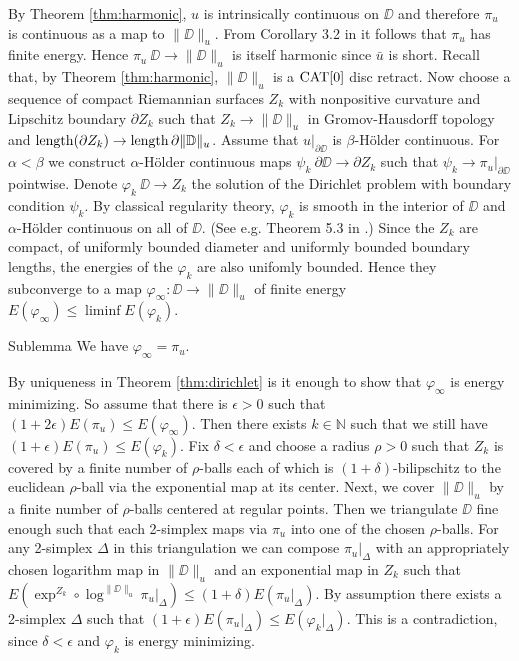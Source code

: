 \documentclass[a4paper,10pt]{amsart}
\begin{document}
By Theorem \ref{thm:harmonic}, $u$ is intrinsically continuous on $\DD$ and therefore $\pi_u$ is continuous as a map to $\|\DD\|_u$. From 
Corollary 3.2 in \cite{LW3} it follows that $\pi_u$ has finite energy. Hence $\pi_u\:\DD\to\|\DD\|_u$ is itself harmonic since $\bar u$
is short. Recall that, by Theorem \ref{thm:harmonic}, $\|\DD\|_u$ is a $\mathop{\rm CAT}\nolimits[0]$ disc retract. Now choose a sequence of compact Riemannian surfaces 
$Z_k$ with nonpositive curvature and Lipschitz boundary $\partial Z_k$
such that $Z_k\to\|\DD\|_u$ in Gromov-Hausdorff topology and $\mathop{\rm length}\nolimits(\partial Z_k)\to\mathop{\rm length}\nolimits \partial\|\mathbb{D}\|_u$. Assume that
$u|_{\partial\DD}$ is $\beta$-H\"older continuous. For $\alpha<\beta$ we construct $\alpha$-H\"older continuous maps 
$\psi_k\:\partial\DD\to\partial Z_k$ such that $\psi_k\to\pi_u|_{\partial\DD}$ pointwise. Denote $\varphi_k\:\DD\to Z_k$ the solution of the Dirichlet problem
with boundary condition $\psi_k$. By classical regularity theory, $\varphi_k$ is smooth in the interior of $\DD$ and $\alpha$-H\"older continuous
on all of $\DD$. (See e.g. Theorem 5.3 in \cite{S}.) Since the $Z_k$ are compact, of uniformly bounded diameter and uniformly bounded boundary lengths, the energies of the
$\varphi_k$ are also unifomly bounded. Hence they subconverge to a map $\varphi_\infty:\DD\to \|\DD\|_u$ of finite energy $E(\varphi_\infty)\leq \liminf E(\varphi_k)$.
\begin{thm}{Sublemma}\label{sublem:minimizer}
We have $\varphi_\infty=\pi_u$.
\end{thm}
By uniqueness in Theorem \ref{thm:dirichlet} is it enough to show that $\varphi_\infty$ is energy minimizing. 
So assume that there is $\epsilon>0$ such that $(1+2\epsilon)E(\pi_u)\leq E(\varphi_\infty)$. Then there exists $k\in\mathbb{N}$
such that we still have $(1+\epsilon)E(\pi_u)\leq E(\varphi_k)$. Fix $\delta<\epsilon$ and choose a radius $\rho>0$
such that $Z_k$ is covered by a finite number of $\rho$-balls each of which is $(1+\delta)$-bilipschitz to the euclidean  
$\rho$-ball via the exponential map at its center. Next, we cover $\|\DD\|_u$ by a finite number of $\rho$-balls centered at regular points.
Then we triangulate $\DD$ fine enough such that each 2-simplex maps via $\pi_u$ into one of the chosen $\rho$-balls. For any 2-simplex
$\Delta$ in this triangulation we can compose $\pi_u|_\Delta$ with an appropriately chosen logarithm map in $\|\DD\|_u$ and an exponential map in 
$Z_k$ such that $E(\exp^{Z_k}\circ\log^{\|\DD\|_u}\pi_u|_\Delta)\leq (1+\delta)E(\pi_u|_\Delta)$. By assumption there exists a 2-simplex
$\Delta$ such that $(1+\epsilon)E(\pi_u|_\Delta)\leq E(\varphi_k|_\Delta)$. This is a contradiction, since $\delta<\epsilon$ and $\varphi_k$ is energy minimizing.
\qeds
\end{document}
